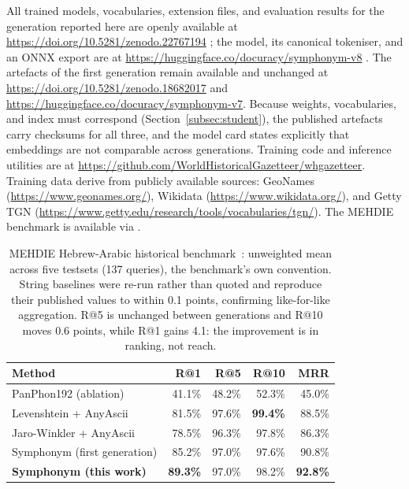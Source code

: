 \documentclass[11pt,a4paper]{article}
\begin{document}
All trained models, vocabularies, extension files, and evaluation results for the generation reported here are openly available at \url{https://doi.org/10.5281/zenodo.22767194} \citep{symphonym2026zenodo}; the model, its canonical tokeniser, and an ONNX export are at \url{https://huggingface.co/docuracy/symphonym-v8} \citep{symphonym2026hf}. The artefacts of the first generation remain available and unchanged at \url{https://doi.org/10.5281/zenodo.18682017} and \url{https://huggingface.co/docuracy/symphonym-v7}. Because weights, vocabularies, and index must correspond (Section~\ref{subsec:student}), the published artefacts carry checksums for all three, and the model card states explicitly that embeddings are not comparable across generations. Training code and inference utilities are at \url{https://github.com/WorldHistoricalGazetteer/whgazetteer}. Training data derive from publicly available sources: GeoNames (\url{https://www.geonames.org/}), Wikidata (\url{https://www.wikidata.org/}), and Getty TGN (\url{https://www.getty.edu/research/tools/vocabularies/tgn/}). The MEHDIE benchmark is available via \citet{mehdie2025}.








\clearpage

\begin{table}[p]
\centering
\small
\begin{tabular}{lrrrr}
\toprule
\textbf{Method} & \textbf{R@1} & \textbf{R@5} & \textbf{R@10} & \textbf{MRR} \\
\midrule
PanPhon192 (ablation)      & 41.1\% & 48.2\% & 52.3\% & 45.0\% \\
Levenshtein + AnyAscii     & 81.5\% & 97.6\% & \textbf{99.4\%} & 88.5\% \\
Jaro-Winkler + AnyAscii    & 78.5\% & 96.3\% & 97.8\% & 86.3\% \\
Symphonym (first generation) & 85.2\% & 97.0\% & 97.6\% & 90.8\% \\
\textbf{Symphonym (this work)} & \textbf{89.3\%} & 97.0\% & 98.2\% & \textbf{92.8\%} \\
\bottomrule
\end{tabular}
\caption{MEHDIE Hebrew-Arabic historical benchmark~\citep{mehdie2025}: unweighted mean across five testsets (137 queries), the benchmark's own convention. String baselines were re-run rather than quoted and reproduce their published values to within 0.1 points, confirming like-for-like aggregation. R@5 is unchanged between generations and R@10 moves 0.6 points, while R@1 gains 4.1: the improvement is in ranking, not reach.}
\label{tab:mehdie-ranking}
\end{table}
\end{document}
